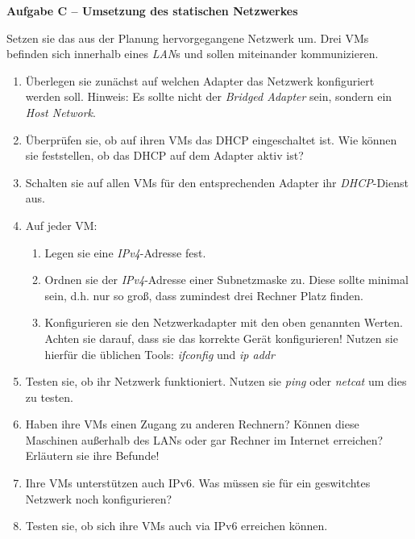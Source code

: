 \documentclass[paper=a4,fontsize=11pt]{scrartcl}%
\begin{document}
\begin{center}\Large{\textbf{Aufgabe C -- Umsetzung des statischen Netzwerkes}}\end{center}\vskip0.25in
Setzen sie das aus der Planung hervorgegangene Netzwerk um. Drei VMs befinden sich innerhalb eines \emph{LAN}s und sollen miteinander kommunizieren.
\begin{enumerate}
	\item Überlegen sie zunächst auf welchen Adapter das Netzwerk konfiguriert werden soll. Hinweis: Es sollte nicht der \emph{Bridged Adapter} sein, sondern ein \emph{Host Network}.
	\item Überprüfen sie, ob auf ihren VMs das DHCP eingeschaltet ist. Wie können sie feststellen, ob das DHCP auf dem Adapter aktiv ist?
	\item Schalten sie auf allen VMs für den entsprechenden Adapter ihr \emph{DHCP}-Dienst aus.
	\item Auf jeder VM:
	\begin{enumerate}
		\item Legen sie eine \emph{IPv4}-Adresse fest.
		\item Ordnen sie der  \emph{IPv4}-Adresse einer Subnetzmaske zu. Diese sollte minimal sein, d.h. nur so groß, dass zumindest drei Rechner Platz finden.
		\item Konfigurieren sie den Netzwerkadapter mit den oben genannten Werten. Achten sie darauf, dass sie das korrekte Gerät konfigurieren! Nutzen sie hierfür die üblichen Tools: \emph{ifconfig} und \emph{ip addr}
	\end{enumerate}
	\item Testen sie, ob ihr Netzwerk funktioniert. Nutzen sie \emph{ping} oder \emph{netcat} um dies zu testen.
	\item Haben ihre VMs einen Zugang zu anderen Rechnern? Können diese Maschinen außerhalb des LANs oder gar Rechner im Internet erreichen? Erläutern sie ihre Befunde!
	\item Ihre VMs unterstützen auch IPv6. Was müssen sie für ein geswitchtes Netzwerk noch konfigurieren?
	\item Testen sie, ob sich ihre VMs auch via IPv6 erreichen können.
\end{enumerate}
\end{document}
